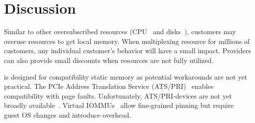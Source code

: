 \section{Discussion}
\label{sec:discussion}

Similar to other oversubscribed resources (CPU~\cite{smartharvest.eurosys21} and disks~\cite{awsdisk}), customers may overuse resources to get local memory.
When multiplexing resource for millions of customers, any individual customer’s behavior will have a small impact.
Providers can also provide small discounts when resources are not fully utilized.

\sys is designed for compatibility static memory as potential workarounds are not yet practical.
The PCIe Address Translation Service (ATS/PRI)~\cite{pcieats.web09} enables compatibility with page faults.
Unfortunately, ATS/PRI-devices are not yet broadly available~\cite{nicpagefault.asplos17}.
Virtual IOMMUs~\cite{tian2020coiommu,amit2011viommu,ben2010turtles} allow fine-grained pinning but require guest OS changes and introduce overhead.

\begin{comment}
\myparagraph{Pool failures}
Compared to a non-CXL system, we introduce the EMC and the pool manager as additional points of failure.
We expect EMC failures to happen at a similar rate to CPU failures.
At \azure, CPUs failure rate are lower than 12 other components.
Pool manager failures affect efficiency, as we cannot reassign memory, but do not affect availability as they are not on the data path.
\end{comment}










